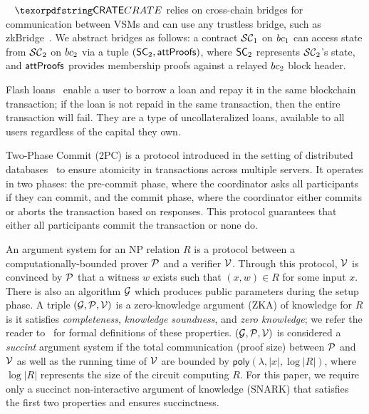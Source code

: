~\label{par:background-bridges}
$\pname$ relies on cross-chain bridges for communication between VSMs and can use any trustless bridge, such as zkBridge~\cite{xiew-zkbridge-22}. We abstract bridges as follows: a contract $\mathcal{SC}_{1}$ on $bc_{1}$ can access state from $\mathcal{SC}_{2}$ on $bc_{2}$ via a tuple $(\mathsf{SC}_{2}, \mathsf{attProofs})$, where $\mathsf{SC}_{2}$ represents $\mathcal{SC}_{2}$'s state, and $\mathsf{attProofs}$ provides membership proofs against a relayed $bc_{2}$ block header.



Flash loans~\cite{qin-attacking-defi-flash-loans-21} enable a user to borrow a loan and repay it in the same blockchain transaction; if the loan is not repaid in the same transaction, then the entire transaction will fail. They are a type of uncollateralized loans, available to all users regardless of the capital they own.




Two-Phase Commit (2PC) is a protocol introduced in the setting of distributed databases~\cite{bernstein-concurrency-databases-1986} to ensure atomicity in transactions across multiple servers. It operates in two phases: the pre-commit phase, where the coordinator asks all participants if they can commit, and the commit phase, where the coordinator either commits or aborts the transaction based on responses. This protocol guarantees that either all participants commit the transaction or none do.

An argument system for an NP relation $R$ is a protocol between a computationally-bounded prover $\mathcal{P}$ and a verifier $\mathcal{V}$. Through this protocol, $\mathcal{V}$ is convinced by $\mathcal{P}$ that a witness $w$ exists such that $(x,w) \in R$ for some input $x$. There is also an algorithm $\mathcal{G}$ which produces public parameters during the setup phase. A triple $(\mathcal{G}, \mathcal{P}, \mathcal{V})$ is a zero-knowledge argument (ZKA) of knowledge for $R$ is it satisfies \emph{completeness}, \emph{knowledge soundness}, and \emph{zero knowledge}; we refer the reader to~\cite{groth-16, thaler-proofs-args-zk-22} for formal definitions of these properties. $(\mathcal{G}, \mathcal{P}, \mathcal{V})$ is considered a \emph{succint} argument system if the total communication (proof size) between $\mathcal{P}$ and $\mathcal{V}$ as well as the running time of $\mathcal{V}$ are bounded by $\mathsf{poly}(\lambda, |x|, \log|R|)$, where $\log|R|$ represents the size of the circuit computing $R$. For this paper, we require only a succinct non-interactive argument of knowledge (SNARK) that satisfies the first two properties and ensures succinctness.
